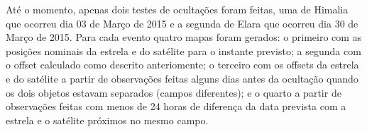 \documentclass[12pt,a4paper]{monografia}
\begin{document}
Até o momento, apenas dois testes de ocultações foram feitas, uma de Himalia que ocorreu dia 03 de Março de 2015 e a segunda de Elara que ocorreu dia 30 de Março de 2015. Para cada evento quatro mapas foram gerados: o primeiro com as posições nominais da estrela e do satélite para o instante previsto; a segunda com o offset calculado como descrito anteriomente; o terceiro com os offsets da estrela e do satélite a partir de observações feitas alguns dias antes da ocultação quando os dois objetos estavam separados (campos diferentes); e o quarto a partir de observações feitas com menos de 24 horas de diferença da data prevista com a estrela e o satélite próximos no mesmo campo.

\begin{figure}
\begin{centering}

\end{centering}
\end{figure}
\end{document}
